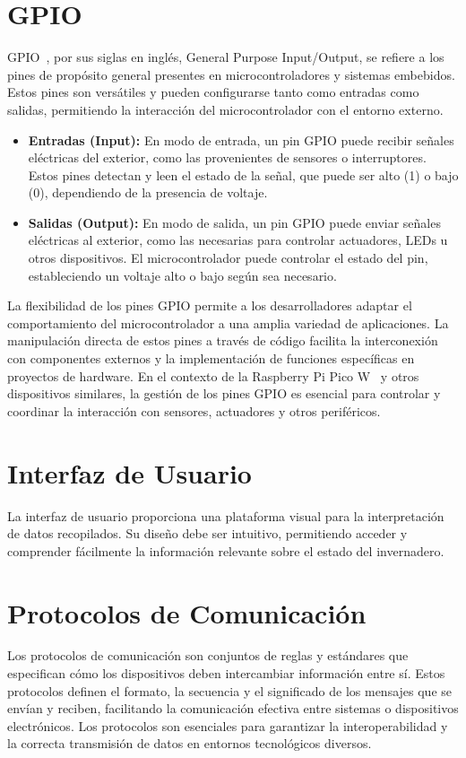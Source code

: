 \section{GPIO}\label{concepto:GPIO}
GPIO~\cite{misc:gpio}, por sus siglas en inglés, General Purpose Input/Output, se refiere a los pines de propósito general presentes en microcontroladores y sistemas embebidos. Estos pines son versátiles y pueden configurarse tanto como entradas como salidas, permitiendo la interacción del microcontrolador con el entorno externo.
\begin{itemize}
	\item \textbf{Entradas (Input):} En modo de entrada, un pin GPIO puede recibir señales eléctricas del exterior, como las provenientes de sensores o interruptores. Estos pines detectan y leen el estado de la señal, que puede ser alto (1) o bajo (0), dependiendo de la presencia de voltaje.

	\item \textbf{Salidas (Output):} En modo de salida, un pin GPIO puede enviar señales eléctricas al exterior, como las necesarias para controlar actuadores, LEDs u otros dispositivos. El microcontrolador puede controlar el estado del pin, estableciendo un voltaje alto o bajo según sea necesario.
\end{itemize}
La flexibilidad de los pines GPIO permite a los desarrolladores adaptar el comportamiento del microcontrolador a una amplia variedad de aplicaciones. La manipulación directa de estos pines a través de código facilita la interconexión con componentes externos y la implementación de funciones específicas en proyectos de hardware. En el contexto de la Raspberry Pi Pico W~\cite{misc:RPiPicoW} y otros dispositivos similares, la gestión de los pines GPIO es esencial para controlar y coordinar la interacción con sensores, actuadores y otros periféricos.

\section{Interfaz de Usuario}
La interfaz de usuario proporciona una plataforma visual para la interpretación de datos recopilados. Su diseño debe ser intuitivo, permitiendo acceder y comprender fácilmente la información relevante sobre el estado del invernadero.

\section{Protocolos de Comunicación}
Los protocolos de comunicación son conjuntos de reglas y estándares que especifican cómo los dispositivos deben intercambiar información entre sí. Estos protocolos definen el formato, la secuencia y el significado de los mensajes que se envían y reciben, facilitando la comunicación efectiva entre sistemas o dispositivos electrónicos. Los protocolos son esenciales para garantizar la interoperabilidad y la correcta transmisión de datos en entornos tecnológicos diversos.

